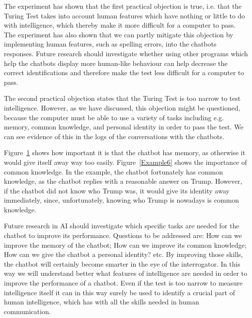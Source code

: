 The experiment has shown that the first practical objection is true, i.e. that the Turing Test takes into account human features which have nothing or little to do with intelligence, which thereby make it more difficult for a computer to pass. The experiment has also shown that we can partly mitigate this objection by implementing human features, such as spelling errors, into the chatbots responses. Future research should investigate whether using other programs which help the chatbots display more human-like behaviour can help decrease the correct identifications and therefore make the test less difficult for a computer to pass.

The second practical objection states that the Turing Test is too narrow to test intelligence. However, as we have discussed, this objection might be questioned, because the computer must be able to use a variety of tasks including e.g. memory, common knowledge, and personal identity in order to pass the test. We can see evidence of this in the logs of the conversations with the chatbots.

\begin{figure}[ht]
   \begin{center}
   \end{center}
   \caption{}
   \label{Example5}
\end{figure}

Figure~\ref{Example5} shows how important it is that the chatbot has memory, as otherwise it would give itself away way too easily. Figure~\ref{Example6} shows the importance of common knowledge. In the example, the chatbot fortunately has common knowledge, as the chatbot replies with a reasonable answer on Trump. However, if the chatbot did not know who Trump was, it would give its identity away immediately, since, unfortunately, knowing who Trump is nowadays is common knowledge.

Future research in AI should investigate which specific tasks are needed for the chatbot to improve its performance. Questions to be addressed are: How can we improve the memory of the chatbot; How can we improve its common knowledge; How can we give the chatbot a personal identity? etc. By improving those skills, the chatbot will certainly become smarter in the eye of the interrogator. In this way we will understand better what features of intelligence are needed in order to improve the performance of a chatbot. Even if the test is too narrow to measure intelligence itself it can in this way surely be used to identify a crucial part of human intelligence, which has with all the skills needed in human communication.

